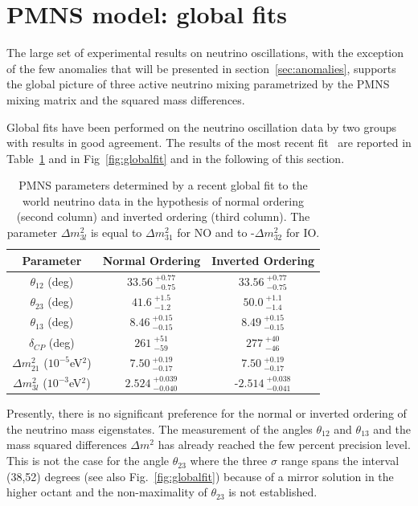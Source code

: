 \section{PMNS model: global fits}
\label{sec:summary}


The large set of experimental results on neutrino oscillations, with the exception of the few anomalies that will be presented in section~\ref{sec:anomalies}, supports the global picture of three active neutrino mixing parametrized by the PMNS mixing matrix and the squared mass differences.

Global fits have been performed on the neutrino oscillation data by two groups~\cite{nufit,Capozzi:2016rtj} with results in good agreement.
The results of the most recent fit~\cite{nufit} are reported in Table~\ref{tab:globalfit} and in Fig~\ref{fig:globalfit} and in the following of this section.

\begin{table}[htbp]
\centering
\begin{tabular}{|c|c|c|}
  \hline
  Parameter & Normal Ordering & Inverted Ordering  \\ 
  \hline
$\theta_{12}$ (deg)& $33.56\:^{+0.77}_{-0.75}$ &  $33.56\:^{+0.77}_{-0.75}$\\  
  $\theta_{23}$ (deg)& $41.6\:^{+1.5}_{-1.2}$ &  $50.0\:^{+1.1}_{-1.4}$\\  
  $\theta_{13}$ (deg)& $8.46\:^{+0.15}_{-0.15}$ & $8.49\:^{+0.15}_{-0.15}$ \\  
  $\delta_{CP}$ (deg)&  $261\:^{+51}_{-59}$& $277\:^{+40}_{-46}$ \\  
  $\Delta m^2_{21}$ ($10^{-5}$eV$^2$)& $7.50\:^{+0.19}_{-0.17}$ & $7.50\:^{+0.19}_{-0.17}$ \\  
  $\Delta m^2_{3l}$ ($10^{-3}$eV$^2$)&  $2.524\:^{+0.039}_{-0.040}$&  -$2.514\:^{+0.038}_{-0.041}$\\  
  \hline
\end{tabular}
\caption{
PMNS parameters determined by a recent global fit to the world neutrino data \cite{nufit} in the hypothesis of normal ordering (second column) and inverted ordering (third column). The parameter $\Delta m^2_{3l}$ is equal to $\Delta m^2_{31}$ for NO and to -$\Delta m^2_{32}$ for IO. }
\label{tab:globalfit}
\end{table}


Presently, there is no significant preference for the normal or inverted ordering of the neutrino mass eigenstates. The measurement of the angles $\theta_{12}$ and 
$\theta_{13}$ and the mass squared differences $\Delta m^2 $ has already reached the few percent precision level. This is not the case for the angle $\theta_{23}$ where the three $\sigma$ range spans the interval (38,52) degrees (see also Fig.~\ref{fig:globalfit}) because of a mirror solution in the higher octant and the non-maximality of $\theta_{23}$ is not established. 

